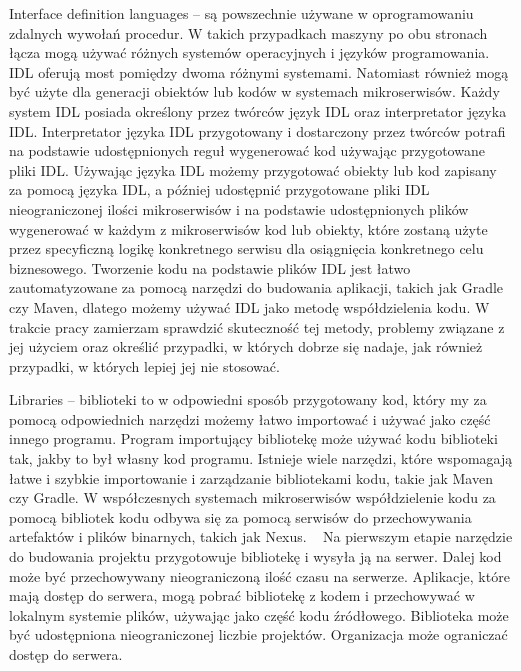 \documentclass[runningheads,12pt]{llncs} \usepackage{graphicx} \usepackage{todonotes} \usepackage{fancyhdr} \usepackage{lipsum} \usepackage[T1]{fontenc} \usepackage[provide=*,english,polish]{babel}
\begin{document}
Interface definition languages – są powszechnie używane w oprogramowaniu zdalnych wywołań procedur. W takich przypadkach maszyny po obu stronach łącza mogą używać różnych systemów operacyjnych i języków programowania. IDL oferują most pomiędzy dwoma różnymi systemami. Natomiast również mogą być użyte dla generacji obiektów lub kodów w systemach mikroserwisów. Każdy system IDL posiada określony przez twórców język IDL oraz interpretator języka IDL. Interpretator języka IDL przygotowany i dostarczony przez twórców potrafi na podstawie udostępnionych reguł wygenerować kod używając przygotowane pliki IDL. Używając języka IDL możemy przygotować obiekty lub kod zapisany za pomocą języka IDL, a później udostępnić przygotowane pliki IDL nieograniczonej ilości mikroserwisów i na podstawie udostępnionych plików wygenerować w każdym z mikroserwisów kod lub obiekty, które zostaną użyte przez specyficzną logikę konkretnego serwisu dla osiągnięcia konkretnego celu biznesowego. Tworzenie kodu na podstawie plików IDL jest łatwo zautomatyzowane za pomocą narzędzi do budowania aplikacji, takich jak Gradle czy Maven, dlatego możemy używać IDL jako metodę współdzielenia kodu. W trakcie pracy zamierzam sprawdzić skuteczność tej metody, problemy związane z jej użyciem oraz określić przypadki, w których dobrze się nadaje, jak również przypadki, w których lepiej jej nie stosować.

Libraries – biblioteki to w odpowiedni sposób przygotowany kod, który my za pomocą odpowiednich narzędzi możemy łatwo importować i używać jako część innego programu. Program importujący bibliotekę może używać kodu biblioteki tak, jakby to był własny kod programu. Istnieje wiele narzędzi, które wspomagają łatwe i szybkie importowanie i zarządzanie bibliotekami kodu, takie jak Maven czy Gradle. W współczesnych systemach mikroserwisów współdzielenie kodu za pomocą bibliotek kodu odbywa się za pomocą serwisów do przechowywania artefaktów i plików binarnych, takich jak Nexus. ~\cite[5]{labouardy2021pipeline} Na pierwszym etapie narzędzie do budowania projektu przygotowuje bibliotekę i wysyła ją na serwer. Dalej kod może być przechowywany nieograniczoną ilość czasu na serwerze. Aplikacje, które mają dostęp do serwera, mogą pobrać bibliotekę z kodem i przechowywać w lokalnym systemie plików, używając jako część kodu źródłowego. Biblioteka może być udostępniona nieograniczonej liczbie projektów. Organizacja może ograniczać dostęp do serwera.
\end{document}
